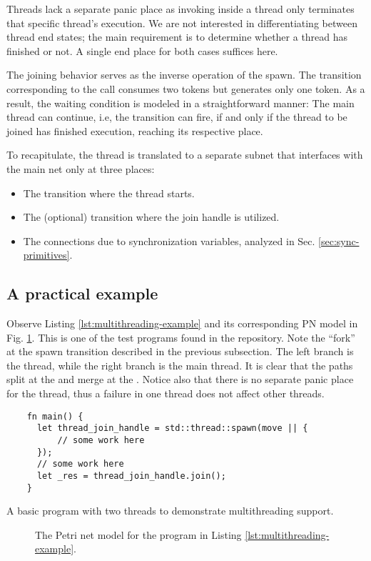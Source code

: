 Threads lack a separate panic place
as invoking  inside a thread
only terminates that specific thread's execution.
We are not interested in differentiating between thread end states;
the main requirement is to determine whether a thread has finished or not.
A single end place for both cases suffices here.

The joining behavior serves as the inverse operation of the spawn.
The transition corresponding to the  call consumes two tokens
but generates only one token.
As a result, the waiting condition is modeled in a straightforward manner:
The main thread can continue, i.e, the  transition can fire,
if and only if the thread to be joined has finished execution,
reaching its respective  place.

To recapitulate, the thread is translated to a separate subnet
that interfaces with the main net only at three places:

\begin{itemize}
  \item The  transition where the thread starts.
  \item The (optional)  transition where the join handle is utilized.
  \item The connections due to synchronization variables, analyzed in Sec. \ref{sec:sync-primitives}.
\end{itemize}

\subsection{A practical example}

Observe Listing \ref{lst:multithreading-example}
and its corresponding \acrshort{PN} model in Fig. \ref{fig:multithreading-example}.
This is one of the test programs found in the repository.
Note the ``fork'' at the spawn transition described in the previous subsection.
The left branch is the thread, while the right branch is the main thread.
It is clear that the paths split at the  and merge
at the .
Notice also that there is no separate panic place for the thread,
thus a failure in one thread does not affect other threads.

\begin{listing}[!htb]
  \begin{verbatim}
    fn main() {
      let thread_join_handle = std::thread::spawn(move || {
          // some work here
      });
      // some work here
      let _res = thread_join_handle.join();
    }  
  \end{verbatim}
  \caption{A basic program with two threads to demonstrate multithreading support.}
  \label{lst:multithreading-example}
\end{listing}

\begin{figure}[!htb]
  \centering
  
  \caption{The Petri net model for the program in Listing \ref{lst:multithreading-example}.}
  \label{fig:multithreading-example}
\end{figure}